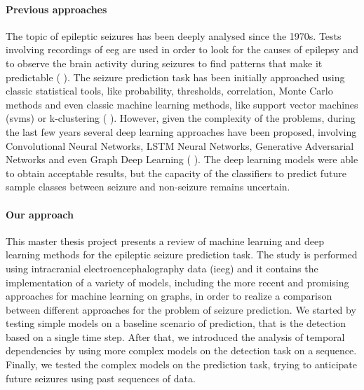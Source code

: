 \paragraph{Previous approaches} The topic of epileptic seizures has been deeply analysed since the 1970s. Tests involving recordings of \acs{eeg} are used in order to look for the causes of epilepsy and to observe the brain activity during seizures to find patterns that make it predictable (\cite{LancetNeurol:Seizurelikelihood} \cite{CurrOpinNeurol:Preseizure}). The seizure prediction task has been initially approached using classic statistical tools, like probability, thresholds, correlation, Monte Carlo methods and even classic machine learning methods, like support vector machines (\acsp{svm}) or k-clustering (\cite{Brain:Longroad} \cite{JClinNeurophysiol:stateoftheart} \cite{IEEE:nonlineareeg} \cite{ClinicalNeurophysiology:chance} \cite{NeuroscienceMethod:therapeuticdevices} \cite{arXiv:VLSIBCISystem} \cite{ComputMathMethodsMed:mlmethods}). However, given the complexity of the problems, during the last few years several deep learning approaches have been proposed, involving Convolutional Neural Networks, LSTM Neural Networks, Generative Adversarial Networks and even Graph Deep Learning (\cite{CurrOpinNeurol:review} \cite{arXiv:earlyseizuredetection} \cite{IEEE:graphtheory} \cite{NeuralNetworks:cnn} \cite{arXiv:quantitativeanalysis} \cite{arXiv:gan}). The deep learning models were able to obtain acceptable results, but the capacity of the classifiers to predict future sample classes between seizure and non-seizure remains uncertain.

\paragraph{Our approach} This master thesis project presents a review of machine learning and deep learning methods for the epileptic seizure prediction task. The study is performed using intracranial electroencephalography data (\acs{ieeg}) and it contains the implementation of a variety of models, including the more recent and promising approaches for machine learning on graphs, in order to realize a comparison between different approaches for the problem of seizure prediction. We started by testing simple models on a baseline scenario of prediction, that is the detection based on a single time step. After that, we introduced the analysis of temporal dependencies by using more complex models on the detection task on a sequence. Finally, we tested the complex models on the prediction task, trying to anticipate future seizures using past sequences of data.

